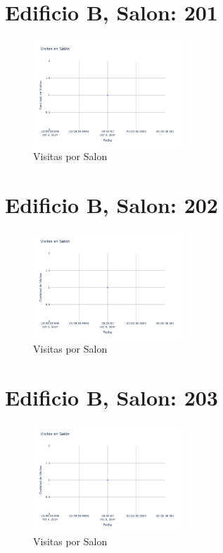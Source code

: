 \documentclass{article}
\begin{document}
    

    \section{Edificio B, Salon: 201}
    \begin{figure}
        \centering
        \includegraphics[width=0.5\textwidth]{../img/poli/VS201-90Dias-03-12-2024.png}
        \caption{Visitas por Salon}
    \end{figure}

    

    \section{Edificio B, Salon: 202}
    \begin{figure}
        \centering
        \includegraphics[width=0.5\textwidth]{../img/poli/VS202-90Dias-03-12-2024.png}
        \caption{Visitas por Salon}
    \end{figure}

    

    \section{Edificio B, Salon: 203}
    \begin{figure}
        \centering
        \includegraphics[width=0.5\textwidth]{../img/poli/VS203-90Dias-03-12-2024.png}
        \caption{Visitas por Salon}
    \end{figure}
\end{document}
